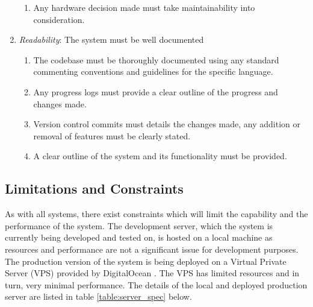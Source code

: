 \begin{enumerate}[label=\textbf{NF\arabic*}]
\begin{enumerate}[leftmargin=0.75in]
		\item Any hardware decision made must take maintainability into consideration.
	\end{enumerate}
\item \textit{Readability}: The system must be well documented
	\begin{enumerate}[leftmargin=0.75in]
		\item The codebase must be thoroughly documented using any standard commenting conventions and guidelines for the specific language.
		\item Any progress logs must provide a clear outline of the progress and changes made.
		\item Version control commits must details the changes made, any addition or removal of features must be clearly stated.
		\item A clear outline of the system and its functionality must be provided.
	\end{enumerate}
\end{enumerate}

\subsection{Limitations and Constraints}
As with all systems, there exist constraints which will limit the capability and the performance of the system. The development server, which the system is currently being developed and tested on, is hosted on a local machine as resources and performance are not a significant issue for development purposes. The production version of the system is being deployed on a Virtual Private Server (VPS) provided by DigitalOcean \cite{DigitalOcean:Home}. The VPS has limited resources and in turn, very minimal performance. The details of the local and deployed production server are listed in table \ref{table:server_spec} below.

